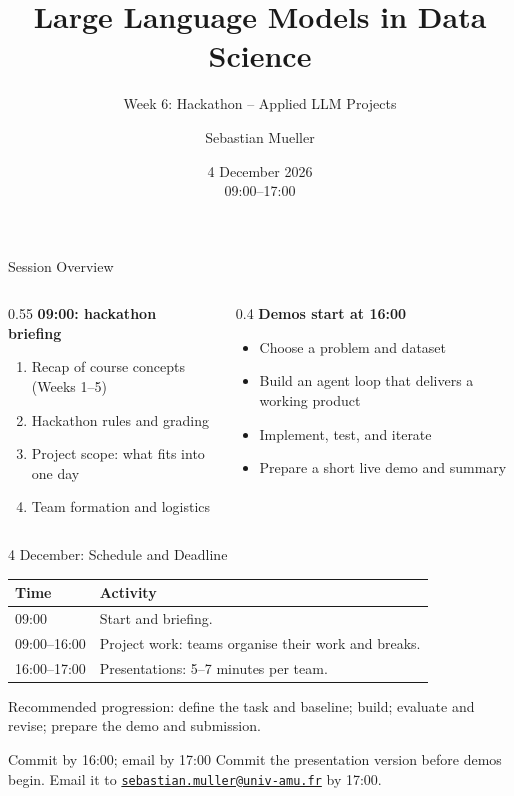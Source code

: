 \documentclass[aspectratio=169]{beamer}
\title{Large Language Models in Data Science}
\subtitle{Week 6: Hackathon -- Applied LLM Projects}
\author{Sebastian Mueller}
\institute{Aix-Marseille Universit\'e}
\date{4 December 2026\\09:00--17:00}
\begin{document}
\begin{frame}[plain]
  \titlepage
\end{frame}

\begin{frame}{Session Overview}
  \begin{columns}[T,onlytextwidth]
    \begin{column}{0.55\linewidth}
      \textbf{09:00: hackathon briefing}
      \begin{enumerate}
        \item Recap of course concepts (Weeks 1--5)
        \item Hackathon rules and grading
        \item Project scope: what fits into one day
        \item Team formation and logistics
      \end{enumerate}
    \end{column}
    \begin{column}{0.4\linewidth}
      \textbf{Demos start at 16:00}
      \begin{itemize}
        \item Choose a problem and dataset
        \item Build an agent loop that delivers a working product
        \item Implement, test, and iterate
        \item Prepare a short live demo and summary
      \end{itemize}
    \end{column}
  \end{columns}
\end{frame}

\begin{frame}{4 December: Schedule and Deadline}
  \renewcommand{\arraystretch}{1.15}
  \begin{tabular}{@{}p{3.2cm}p{9.2cm}@{}}
    \toprule
    \textbf{Time} & \textbf{Activity} \\
    \midrule
    09:00 & Start and briefing. \\
    09:00--16:00 & Project work: teams organise their work and breaks. \\
    16:00--17:00 & Presentations: 5--7 minutes per team. \\
    \bottomrule
  \end{tabular}
  \par\vspace{0.7em}
  Recommended progression: define the task and baseline; build; evaluate and revise; prepare the demo and submission.
  \begin{block}{Commit by 16:00; email by 17:00}
    Commit the presentation version before demos begin. Email it to \href{mailto:sebastian.muller@univ-amu.fr}{\texttt{sebastian.muller@univ-amu.fr}} by 17:00.
  \end{block}
\end{frame}
\end{document}
